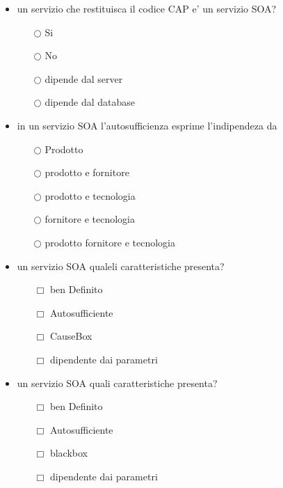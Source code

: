 \documentclass[10pt,twocolumn]{article}
\begin{document}
\begin{itemize}
    \item un servizio che restituisca il codice CAP e' un servizio SOA?
          \begin{itemize}
              \item[$\bigcirc$] Si
              \item[$\bigcirc$] No
              \item[$\bigcirc$] dipende dal server
              \item[$\bigcirc$] dipende dal database
          \end{itemize}
\end{itemize}
\begin{itemize}
    \item in un servizio SOA l'autosufficienza esprime l'indipendeza da
          \begin{itemize}
              \item[$\bigcirc$] Prodotto
              \item[$\bigcirc$] prodotto e fornitore
              \item[$\bigcirc$] prodotto e tecnologia
              \item[$\bigcirc$] fornitore e tecnologia
              \item[$\bigcirc$] prodotto fornitore e tecnologia
          \end{itemize}
\end{itemize}
\begin{itemize}
    \item un servizio SOA qualeli caratteristiche presenta?
          \begin{itemize}
              \item[$\Box$] ben Definito
              \item[$\Box$] Autosufficiente
              \item[$\Box$] CauseBox
              \item[$\Box$] dipendente dai parametri
          \end{itemize}
\end{itemize}
\begin{itemize}
    \item un servizio SOA quali caratteristiche presenta?
          \begin{itemize}
              \item[$\Box$] ben Definito
              \item[$\Box$] Autosufficiente
              \item[$\Box$] blackbox
              \item[$\Box$] dipendente dai parametri
          \end{itemize}
\end{itemize}
\end{document}
